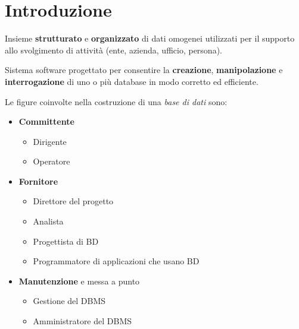 \newpage
\section{Introduzione}
\begin{definition}
	Insieme	\textbf{strutturato} e \textbf{organizzato} di dati omogenei utilizzati per il supporto allo svolgimento di attività (ente, azienda, ufficio, persona).
\end{definition}

\begin{definition}
	Sistema software progettato per consentire la \textbf{creazione}, \textbf{manipolazione} e \textbf{interrogazione} di uno o più database in modo corretto ed efficiente.
\end{definition}

\noindent Le figure coinvolte nella costruzione di una \textit{base di dati} sono:
\begin{itemize}
	\item \textbf{Committente}
	\begin{itemize}
		\item Dirigente
		\item Operatore
	\end{itemize}
	\item \textbf{Fornitore}
	\begin{itemize}
		\item Direttore del progetto
		\item Analista
		\item Progettista di BD
		\item Programmatore di applicazioni che usano BD
	\end{itemize}
	\item \textbf{Manutenzione} e messa a punto
	\begin{itemize}
		\item Gestione del DBMS
		\item Amministratore del DBMS
	\end{itemize}
\end{itemize}
